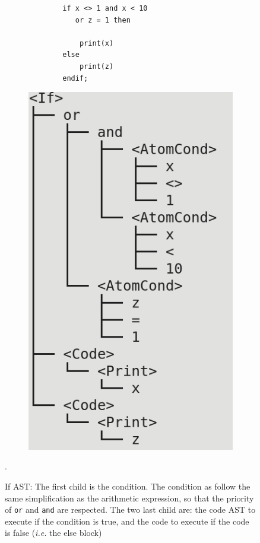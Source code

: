 \documentclass[letterpaper]{article}
\begin{document}
\begin{figure}[H]
    \begin{subfigure}{.5\textwidth}
        \begin{lstlisting}
        if x <> 1 and x < 10
           or z = 1 then

            print(x)
        else
            print(z)
        endif;
        \end{lstlisting}
    \end{subfigure}
    \begin{subfigure}{.5\textwidth}
    \includegraphics[scale=0.5]{image/if.png}
    \end{subfigure}
    \caption{If AST: The first child is the condition. The condition as
    follow the same simplification as the arithmetic expression, so that
    the priority of \texttt{or} and \texttt{and} are respected. The
    two last child are: the code AST to execute if the condition is true,
    and the code to execute if the code is false
     (\textit{i.e.} the else block)}.
\end{figure}
\end{document}
